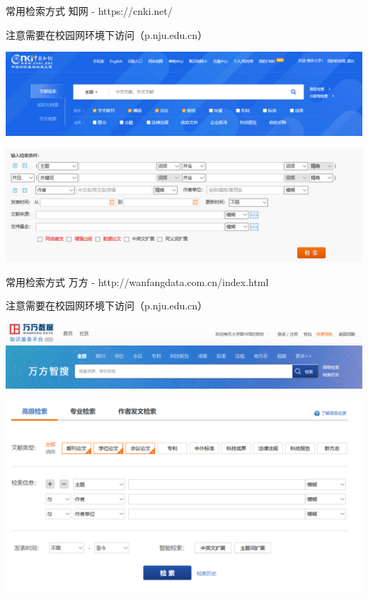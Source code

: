 \documentclass[10pt]{beamer}
\begin{document}
\begin{frame}[fragile]{常用检索方式}
    知网 - https://cnki.net/

    注意需要在校园网环境下访问（p.nju.edu.cn）

    \includegraphics[width=\textwidth]{pic/CNKI.png}

    \includegraphics[width=\textwidth]{pic/CNKI-2.png}

\end{frame}

\begin{frame}[fragile]{常用检索方式}
    万方 - http://wanfangdata.com.cn/index.html

    注意需要在校园网环境下访问（p.nju.edu.cn）

    \includegraphics[width=\textwidth]{pic/Wanfang-1.png}

    \includegraphics[width=\textwidth]{pic/Wanfang-2.png}
\end{frame}
\end{document}
